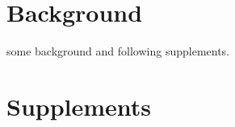 \section{Background}
some background and following supplements. 

\section{Supplements}
\setcounter{table}{0}
\renewcommand{\thetable}{S\arabic{table}}
\setcounter{figure}{0}
\renewcommand{\thefigure}{S\arabic{figure}}

